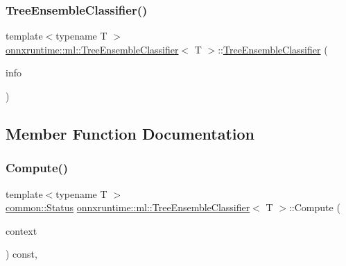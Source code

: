 \subsubsection{\texorpdfstring{Tree\+Ensemble\+Classifier()}{TreeEnsembleClassifier()}}
{\footnotesize\ttfamily template$<$typename T $>$ \\
\mbox{\hyperlink{classonnxruntime_1_1ml_1_1TreeEnsembleClassifier}{onnxruntime\+::ml\+::\+Tree\+Ensemble\+Classifier}}$<$ T $>$\+::\mbox{\hyperlink{classonnxruntime_1_1ml_1_1TreeEnsembleClassifier}{Tree\+Ensemble\+Classifier}} (\begin{DoxyParamCaption}\item[{const \mbox{\hyperlink{classonnxruntime_1_1OpKernelInfo}{Op\+Kernel\+Info}} \&}]{info }\end{DoxyParamCaption})\hspace{0.3cm}{\ttfamily [explicit]}}



\subsection{Member Function Documentation}
\mbox{\label{classonnxruntime_1_1ml_1_1TreeEnsembleClassifier_a324a0a2464c55eabc8c3b562929b2b84}} 
\subsubsection{\texorpdfstring{Compute()}{Compute()}}
{\footnotesize\ttfamily template$<$typename T $>$ \\
\mbox{\hyperlink{classonnxruntime_1_1common_1_1Status}{common\+::\+Status}} \mbox{\hyperlink{classonnxruntime_1_1ml_1_1TreeEnsembleClassifier}{onnxruntime\+::ml\+::\+Tree\+Ensemble\+Classifier}}$<$ T $>$\+::Compute (\begin{DoxyParamCaption}\item[{\mbox{\hyperlink{classonnxruntime_1_1OpKernelContext}{Op\+Kernel\+Context}} $\ast$}]{context }\end{DoxyParamCaption}) const\hspace{0.3cm}{\ttfamily [override]}, {\ttfamily [virtual]}}




